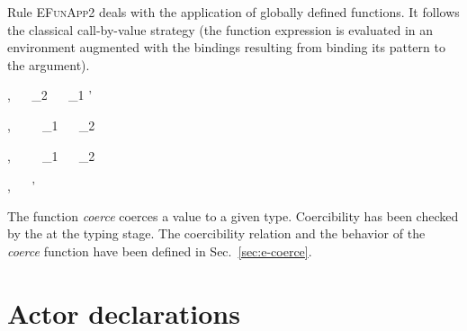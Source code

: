 Rule \textsc{EFunApp2} deals with the application of globally defined functions. It follows the classical call-by-value
strategy (the function expression is evaluated in an environment augmented with the bindings resulting
from binding its pattern to the argument). 

{\TE,\EE \vdash {}~  \tm{=}~ _2~ ~ _1 \gives \vv'}

{\TE,\EE \vdash {}~ ~ ~ _1~ ~ _2 \gives \vv}

{\TE,\EE \vdash {}~ ~ ~ _1~ ~ _2 \gives \vv}




{\TE,\EE \vdash {}~ \tm{:}~  \gives \vv'}

The function \emph{coerce} coerces a value to a given type. Coercibility has been checked by the at
the typing stage. The coercibility relation and the behavior of the \emph{coerce} function have been
defined in Sec.~\ref{sec:e-coerce}.

\section{Actor declarations}
\label{sec:static-actor-declarations}

